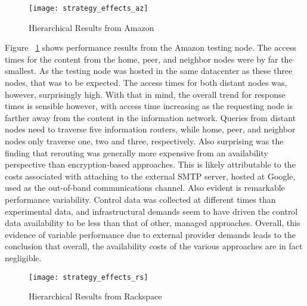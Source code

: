 \begin{figure}[!t]
\centering
\texttt{[image: strategy\_effects\_az]}
\caption{Hierarchical Results from Amazon}
\label{fig:model:amazon-results}
\end{figure}

Figure ~\ref{fig:model:amazon-results} shows performance results from the Amazon testing node.  The access times for the content from the home, peer, and neighbor nodes were by far the smallest.  As the testing node was hosted in the same datacenter as these three nodes, that was to be expected.  The access times for both distant nodes was, however, surprisingly high.  With that in mind, the overall trend for response times is sensible however, with access time increasing as the requesting node is farther away from the content in the information network.  Queries from distant nodes need to traverse five information routers, while home, peer, and neighbor nodes only traverse one, two and three, respectively.  Also surprising was the finding that rerouting was generally more expensive from an availability perspective than encryption-based approaches.  This is likely attributable to the costs associated with attaching to the external SMTP server, hosted at Google, used as the out-of-band communications channel.  Also evident is remarkable performance variability.  Control data was collected at different times than experimental data, and infrastructural demands seem to have driven the control data availability to be less than that of other, managed approaches.  Overall, this evidence of variable performance due to external provider demands leads to the conclusion that overall, the availability costs of the various approaches are in fact negligible.

\begin{figure}[!t]
\centering
\texttt{[image: strategy\_effects\_rs]}
\caption{Hierarchical Results from Rackspace}
\label{fig:model:rackspace-results}
\end{figure}


